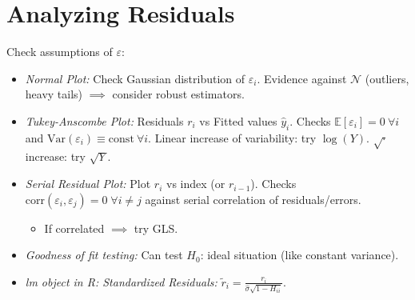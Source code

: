 \section{Analyzing Residuals}
Check assumptions of $\varepsilon$:
\begin{itemize}
    \item \textit{Normal Plot:} Check Gaussian distribution of $\varepsilon_i$.
    Evidence against $\mathcal{N}$ (outliers, heavy tails) $\implies$ consider robust estimators.
    \item \textit{Tukey-Anscombe Plot:} Residuals $r_i$ vs Fitted values $\hat{y}_i$.
    Checks $\mathbb{E}[\varepsilon_i]=0 \ \forall i$ and $\text{Var}(\varepsilon_i) \equiv \text{const} \ \forall i$.
    Linear increase of variability: try $\log(Y)$.
    $\sqrt{\cdot}$ increase: try $\sqrt{Y}$.
    \item \textit{Serial Residual Plot:} Plot $r_i$ vs index (or $r_{i-1}$).
    Checks $\text{corr}(\varepsilon_i, \varepsilon_j) = 0 \; \forall i \neq j$ against serial correlation of residuals/errors.
    \begin{itemize}
        \item If correlated $\implies$ try GLS.
    \end{itemize}
    \item \textit{Goodness of fit testing:} Can test $H_0$: ideal situation (like constant variance).
    \item \textit{lm object in R: Standardized Residuals:} $\tilde{r}_i = \frac{r_i}{\hat{\sigma}\sqrt{1-H_{ii}}}$.
\end{itemize}
